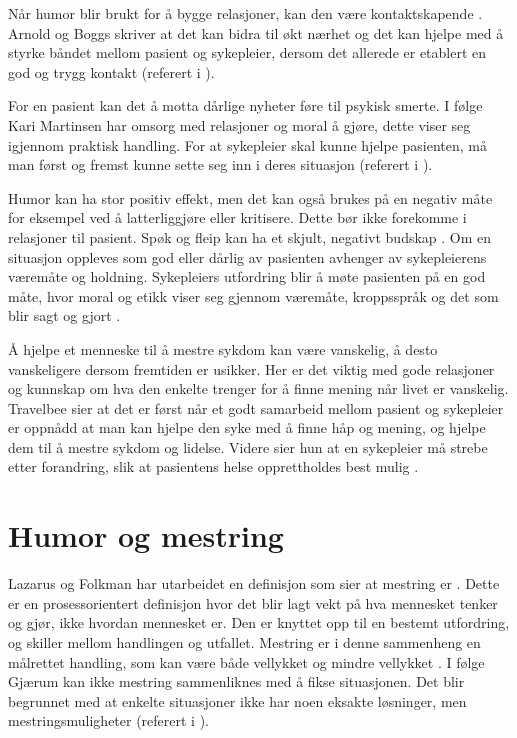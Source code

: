 Når humor blir brukt for å bygge relasjoner, kan den være kontaktskapende
\cite[s.~192]{spurkeland2002}. Arnold og Boggs skriver at det kan bidra til økt
nærhet og det kan hjelpe med å styrke båndet mellom pasient og sykepleier,
dersom det allerede er etablert en god og trygg kontakt (referert i
).

For en pasient kan det å motta dårlige nyheter føre til psykisk smerte. I følge
Kari Martinsen har omsorg med relasjoner og moral å gjøre, dette viser seg
igjennom praktisk handling. For at sykepleier skal kunne hjelpe pasienten, må
man  først og fremst kunne sette seg inn i deres situasjon (referert i
).

Humor kan ha stor positiv effekt, men det kan også brukes på en negativ måte
for eksempel ved å latterliggjøre eller kritisere. Dette bør ikke forekomme i
relasjoner til pasient. Spøk og fleip kan ha et skjult, negativt budskap
\cite[s.~246]{eide2008}. Om en situasjon oppleves som god eller dårlig av
pasienten avhenger av sykepleierens væremåte og holdning.  Sykepleiers
utfordring blir å møte pasienten på en god måte, hvor moral og etikk viser seg
gjennom væremåte, kroppsspråk og det som blir sagt og gjort
\cite[s.~127]{brinchmann2008}.

Å hjelpe et menneske til å mestre sykdom kan være vanskelig, å desto
vanskeligere dersom fremtiden er usikker. Her er det viktig med gode relasjoner
og kunnskap om hva den enkelte trenger for å finne mening når livet er
vanskelig. Travelbee sier at det er først når et godt samarbeid mellom pasient
og sykepleier er oppnådd at man kan hjelpe den syke med å finne håp og mening,
og hjelpe dem til å mestre sykdom og lidelse. Videre sier hun at en sykepleier
må strebe etter forandring, slik at pasientens helse opprettholdes best mulig
\cite[s.~30]{travelbee2001}.

\section{Humor og mestring}

Lazarus og Folkman har utarbeidet en definisjon som sier at mestring er
. Dette er en prosessorientert definisjon hvor
det blir lagt vekt på hva mennesket tenker og gjør, ikke hvordan mennesket er.
Den er knyttet opp til en bestemt utfordring, og skiller mellom handlingen og
utfallet. Mestring er i denne sammenheng en målrettet handling, som kan være
både vellykket og mindre vellykket \cite[s.~65]{heggen2010}. I følge Gjærum kan
ikke mestring sammenliknes med å fikse situasjonen. Det blir begrunnet med at
enkelte situasjoner ikke har noen eksakte løsninger, men mestringsmuligheter
(referert i ).

